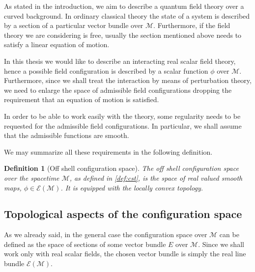 \documentclass[11pt]{book}
\newcommand{\Ecal}{\mathcal{E}}
\newcommand{\Mcal}{\mathcal{M}}
\theoremstyle{break}
\newtheorem{definition}{Definition}[chapter]
\begin{document}
As stated in the introduction, we aim to describe a quantum field theory over a curved background. In ordinary classical theory the state of a system is described by a section of a particular vector bundle over $\Mcal$. Furthermore, if the field theory we are considering is free, usually the section mentioned above needs to satisfy a linear equation of motion.


In this thesis we would like to describe an interacting real scalar field theory, hence a possible field configuration is described by a scalar function $\phi$ over $\Mcal$. Furthermore, since we shall treat the interaction by means of perturbation theory, we need to enlarge the space of admissible field configurations dropping the requirement that an equation of motion is satisfied.


In order to be able to work easily with the theory, some regularity needs to be requested for the admissible field configurations. In particular, we shall assume that the admissible functions are smooth.   


We may summarize all these requirements in the following definition.


\begin{definition}[Off shell configuration space]\label{def:config_space}
The off shell configuration space over the spacetime $\Mcal$, as defined in \ref{def:cst}, is the space of real valued smooth maps, $\phi \in \Ecal(\Mcal)$. It is equipped with the locally convex topology.
\end{definition}


\subsection{Topological aspects of the configuration space}
\label{p:TOPO_CONFIG_SPACE}


As we already said, in the general case the configuration space over $\Mcal$ can be defined as the space of sections of some vector bundle $E$ over $\Mcal$. Since we shall work only with real scalar fields, the chosen vector bundle is simply the real line bundle $\Ecal(\Mcal)$.
\end{document}
